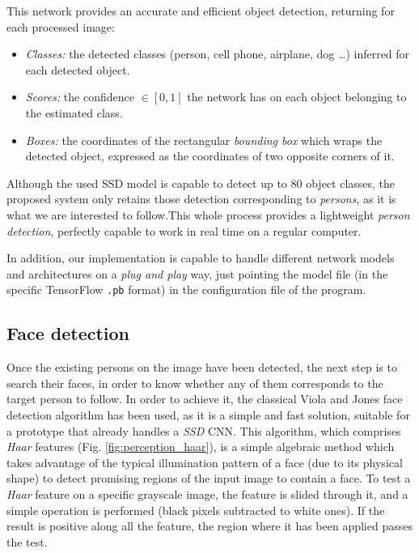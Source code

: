 This network provides an accurate and efficient object detection, returning for each processed image:
\begin{itemize}
	\item \emph{Classes:} the detected classes (person, cell phone, airplane, dog \dots) inferred for each detected object.
	\item \emph{Scores:} the confidence $\in [0,1]$ the network has on each object belonging to the estimated class.
	\item \emph{Boxes:} the coordinates of the rectangular \emph{bounding box} which wraps the detected object, expressed as the coordinates of two opposite corners of it.
\end{itemize}

Although the used SSD model is capable to detect up to 80 object classes, the proposed system only retains those detection corresponding to \emph{persons}, as it is what we are interested to follow.This whole process provides a lightweight \emph{person detection}, perfectly capable to work in real time on a regular computer.

In addition, our implementation is capable to handle different network models and architectures on a \emph{plug and play} way, just pointing the model file (in the specific TensorFlow \texttt{.pb} format) in the configuration file of the program.


\subsection{Face detection}

Once the existing persons on the image have been detected, the next step is to search their faces, in order to know whether any of them corresponds to the target person to follow. In order to achieve it, the classical Viola and Jones face detection algorithm \cite{viola-jones} has been used, as it is a simple and fast solution, suitable for a prototype that already handles a \emph{SSD} CNN. This algorithm, which comprises \emph{Haar} features (Fig. \ref{fig:perception_haar}), is a simple algebraic method which takes advantage of the typical illumination pattern of a face (due to its physical shape) to detect promising regions of the input image to contain a face. To test a \emph{Haar} feature on a specific grayscale image, the feature is slided through it, and a simple operation is performed (black pixels subtracted to white ones). If the result is positive along all the feature, the region where it has been applied passes the test.


